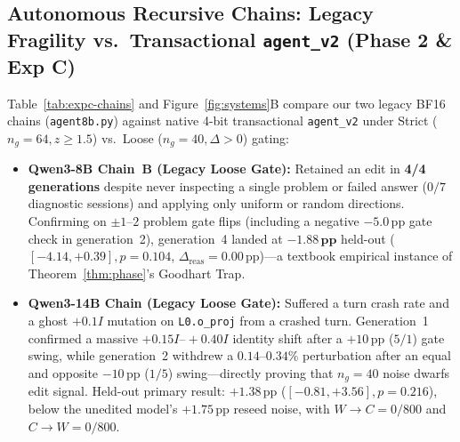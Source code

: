 \documentclass[10pt]{article}
\begin{document}
\TableExpDGPQA
\TableExpDCrossDomain

\subsection{Autonomous Recursive Chains: Legacy Fragility vs.\ Transactional \texttt{agent\_v2} (Phase 2 \& Exp C)}
\label{sec:expc}

Table~\ref{tab:expc-chains} and Figure~\ref{fig:systems}B compare our two legacy BF16 chains (\texttt{agent8b.py}) against native 4-bit transactional \texttt{agent\_v2} under Strict ($n_g=64, z\ge 1.5$) vs.\ Loose ($n_g=40, \Delta>0$) gating:

\begin{itemize}[leftmargin=1.4em,itemsep=2pt,topsep=2pt]
    \item \textbf{Qwen3-8B Chain~B (Legacy Loose Gate):} Retained an edit in \textbf{4/4 generations} despite never inspecting a single problem or failed answer ($0/7$ diagnostic sessions) and applying only uniform or random directions. Confirming on $\pm 1\text{--}2$ problem gate flips (including a negative $-5.0$\,pp gate check in generation~2), generation~4 landed at $\mathbf{-1.88\,\text{pp}}$ held-out ($[-4.14,+0.39], p=0.104$, $\Delta_{\mathrm{reas}}=0.00$\,pp)---a textbook empirical instance of Theorem~\ref{thm:phase}'s Goodhart Trap.
    \item \textbf{Qwen3-14B Chain (Legacy Loose Gate):} Suffered a \textbf{\LegacyFourteenErr{}} turn crash rate and a ghost $+0.1I$ mutation on \texttt{L0.o\_proj} from a crashed turn. Generation~1 confirmed a massive $+0.15I\text{--}+0.40I$ identity shift after a $+10$\,pp ($5/1$) gate swing, while generation~2 withdrew a $0.14\text{--}0.34\%$ perturbation after an equal and opposite $-10$\,pp ($1/5$) swing---directly proving that $n_g=40$ noise dwarfs edit signal. Held-out primary result: $+1.38$\,pp ($[-0.81,+3.56], p=0.216$), below the unedited model's $+1.75$\,pp reseed noise, with $W\!\to\!C = 0/800$ and $C\!\to\!W = 0/800$.

\end{itemize}
\end{document}
